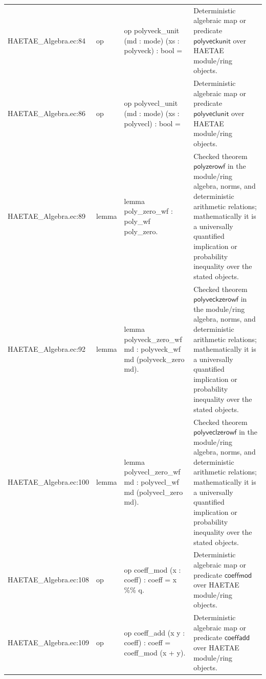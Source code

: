 \documentclass[10pt]{article}
\begin{document}
\begin{longtable}{L{0.11\textwidth}L{0.055\textwidth}L{0.385\textwidth}L{0.41\textwidth}}
HAETAE\_\allowbreak{}Algebra.\allowbreak{}ec:\allowbreak{}84 & op & {\ttfamily\scriptsize op polyveck\_\allowbreak{}unit (md : mode) (xs : polyveck) : bool =} & Deterministic algebraic map or predicate $\mathsf{polyveckunit}$ over HAETAE module/ring objects. \\
HAETAE\_\allowbreak{}Algebra.\allowbreak{}ec:\allowbreak{}86 & op & {\ttfamily\scriptsize op polyvecl\_\allowbreak{}unit (md : mode) (xs : polyvecl) : bool =} & Deterministic algebraic map or predicate $\mathsf{polyveclunit}$ over HAETAE module/ring objects. \\
HAETAE\_\allowbreak{}Algebra.\allowbreak{}ec:\allowbreak{}89 & lemma & {\ttfamily\scriptsize lemma poly\_\allowbreak{}zero\_\allowbreak{}wf : poly\_\allowbreak{}wf poly\_\allowbreak{}zero.} & Checked theorem $\mathsf{polyzerowf}$ in the module/ring algebra, norms, and deterministic arithmetic relations; mathematically it is a universally quantified implication or probability inequality over the stated objects. \\
HAETAE\_\allowbreak{}Algebra.\allowbreak{}ec:\allowbreak{}92 & lemma & {\ttfamily\scriptsize lemma polyveck\_\allowbreak{}zero\_\allowbreak{}wf md : polyveck\_\allowbreak{}wf md (polyveck\_\allowbreak{}zero md).} & Checked theorem $\mathsf{polyveckzerowf}$ in the module/ring algebra, norms, and deterministic arithmetic relations; mathematically it is a universally quantified implication or probability inequality over the stated objects. \\
HAETAE\_\allowbreak{}Algebra.\allowbreak{}ec:\allowbreak{}100 & lemma & {\ttfamily\scriptsize lemma polyvecl\_\allowbreak{}zero\_\allowbreak{}wf md : polyvecl\_\allowbreak{}wf md (polyvecl\_\allowbreak{}zero md).} & Checked theorem $\mathsf{polyveclzerowf}$ in the module/ring algebra, norms, and deterministic arithmetic relations; mathematically it is a universally quantified implication or probability inequality over the stated objects. \\
HAETAE\_\allowbreak{}Algebra.\allowbreak{}ec:\allowbreak{}108 & op & {\ttfamily\scriptsize op coeff\_\allowbreak{}mod (x : coeff) : coeff = x \%\% q.} & Deterministic algebraic map or predicate $\mathsf{coeffmod}$ over HAETAE module/ring objects. \\
HAETAE\_\allowbreak{}Algebra.\allowbreak{}ec:\allowbreak{}109 & op & {\ttfamily\scriptsize op coeff\_\allowbreak{}add (x y : coeff) : coeff = coeff\_\allowbreak{}mod (x + y).} & Deterministic algebraic map or predicate $\mathsf{coeffadd}$ over HAETAE module/ring objects. \\

\end{longtable}
\end{document}
